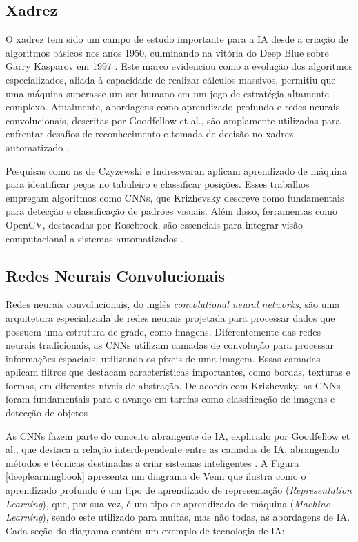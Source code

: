 \documentclass[journal]{IEEEtran} %
\begin{document}
\subsection{Xadrez}

O xadrez tem sido um campo de estudo importante para a IA desde a criação de algoritmos básicos nos anos 1950, culminando na vitória do Deep Blue sobre Garry Kasparov em 1997 \cite{weber1997deepblue}. Este marco evidenciou como a evolução dos algoritmos especializados, aliada à capacidade de realizar cálculos massivos, permitiu que uma máquina superasse um ser humano em um jogo de estratégia altamente complexo. Atualmente, abordagens como aprendizado profundo e redes neurais convolucionais, descritas por Goodfellow et al., são amplamente utilizadas para enfrentar desafios de reconhecimento e tomada de decisão no xadrez automatizado \cite{goodfellow2016}.

Pesquisas como as de Czyzewski e Indreswaran aplicam aprendizado de máquina para identificar peças no tabuleiro e classificar posições. Esses trabalhos empregam algoritmos como CNNs, que Krizhevsky descreve como fundamentais para detecção e classificação de padrões visuais. Além disso, ferramentas como OpenCV, destacadas por Rosebrock, são essenciais para integrar visão computacional a sistemas automatizados \cite{czyzewski2020,indreswaran2016,krizhevsky2014,rosebrock2020}.

\subsection{Redes Neurais Convolucionais}

Redes neurais convolucionais, do inglês \textit{convolutional neural networks}, são uma arquitetura especializada de redes neurais projetada para processar dados que possuem uma estrutura de grade, como imagens. Diferentemente das redes neurais tradicionais, as CNNs utilizam camadas de convolução para processar informações espaciais, utilizando os píxeis de uma imagem. Essas camadas aplicam filtros que destacam características importantes, como bordas, texturas e formas, em diferentes níveis de abstração. De acordo com Krizhevsky, as CNNs foram fundamentais para o avanço em tarefas como classificação de imagens e detecção de objetos \cite{krizhevsky2014}.

As CNNs fazem parte do conceito abrangente de IA, explicado por Goodfellow et al., que destaca a relação interdependente entre as camadas de IA, abrangendo métodos e técnicas destinadas a criar sistemas inteligentes \cite{goodfellow2016}. A Figura \ref{deeplearningbook} apresenta um diagrama de Venn que ilustra como o aprendizado profundo é um tipo de aprendizado de representação (\textit{Representation Learning}), que, por sua vez, é um tipo de aprendizado de máquina (\textit{Machine Learning}), sendo este utilizado para muitas, mas não todas, as abordagens de IA. Cada seção do diagrama contém um exemplo de tecnologia de IA:
\end{document}
